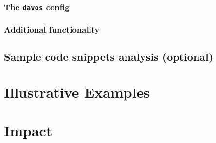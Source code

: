 \documentclass[preprint,12pt, a4paper]{elsarticle}
\newcommand{\comment}[1]{}
\begin{document}
\subsubsection{The \texttt{davos} config}

\subsubsection{Additional functionality}



\subsection{Sample code snippets analysis (optional)}


\section{Illustrative Examples}



\section{Impact}
\comment{
- emphasize research domain-independent application (Journal's goals/values page says they prioritize this in submissions)
- applicability not limited to research
    - regression (?) testing
    - ***^^not sure this should be included -- hurts framing of davos as "research software"***
- makes writing and running publicly available reproducible code more accessible (lowers required software comfort/familiarity level \& computing resources vs. installing docker/singularity/conda)
    - also removes these requirements from other scenarios, e.g., easier for new/less experienced students/RAs to get involved with analyses
- mention something about not having to teach environment management to teach day 1 python lesson, or spend hours debugging conda installation in order to share tutorial or demo with students
    - e.g., "researchers who teach \_\_\_ may be familiar with the experience of running a lesson or workshop that requires students to use Docker (or similar...) to run their code, only to spend the majority of class time debugging students' computing environments rather than teaching the lesson itself."
}
\end{document}
